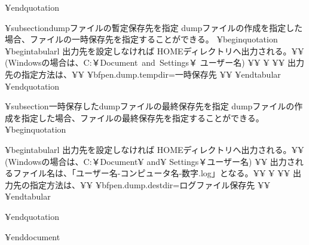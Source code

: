 
¥end{quotation}

¥subsection{dumpファイルの暫定保存先を指定}
dumpファイルの作成を指定した場合、ファイルの一時保存先を指定することができる。
¥begin{quotation}
¥begin{tabular}{l}
出力先を設定しなければ HOMEディレクトリへ出力される。¥¥
(Windowsの場合は、C:￥Document~and~Settings￥ ユーザー名) ¥¥
¥ ¥¥
出力先の指定方法は、¥¥
{¥bf{pen.dump.tempdir=一時保存先}} ¥¥
¥end{tabular}
¥end{quotation}

¥subsection{一時保存したdumpファイルの最終保存先を指定}
dumpファイルの作成を指定した場合、ファイルの最終保存先を指定することができる。
¥begin{quotation}

¥begin{tabular}{l}
出力先を設定しなければ HOMEディレクトリへ出力される。¥¥
(Windowsの場合は、C:￥Document¥ and¥ Settings￥ユーザー名) ¥¥
出力されるファイル名は、「ユーザー名-コンピュータ名-数字.log」となる。¥¥
¥ ¥¥
出力先の指定方法は、¥¥
{¥bf{pen.dump.destdir=ログファイル保存先}} ¥¥
¥end{tabular}

¥end{quotation}

¥end{document}


